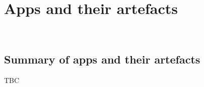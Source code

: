\chapter{Apps and their artefacts}~\label{chapter-apps-and-their-artefacts}

\section{Summary of apps and their artefacts}
TBC